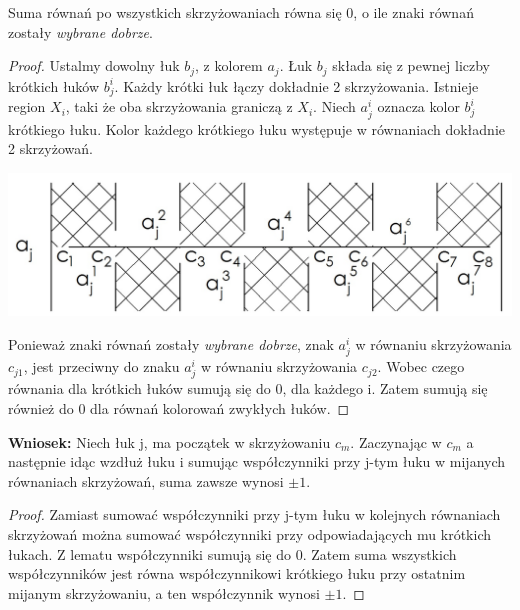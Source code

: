 \begin{lemat}
Suma równań po wszystkich skrzyżowaniach równa się 0, o ile znaki równań zostały \emph{wybrane dobrze}.
\end{lemat}
\begin{proof}
Ustalmy dowolny łuk $b_{j}$, z kolorem  $a_{j}$. Łuk $b_{j}$ składa się z pewnej liczby krótkich łuków $b_{j}^{i}$. Każdy krótki łuk łączy dokładnie 2 skrzyżowania. Istnieje region $X_{i}$, taki że oba skrzyżowania graniczą z $X_{i}$. Niech $a_{j}^{i}$ oznacza kolor $b_{j}^{i}$ krótkiego łuku. Kolor każdego krótkiego łuku występuje w równaniach dokładnie 2 skrzyżowań.
\begin{center}
  			\includegraphics[scale=0.3]{2/Obrazy/zerosum2}
\end{center}
Ponieważ znaki równań zostały  \emph{wybrane dobrze}, znak $a_{j}^{i}$ w równaniu skrzyżowania  
$c_{j1}$, jest przeciwny do znaku $a_{j}^{i}$ w równaniu skrzyżowania $c_{j2}$. Wobec czego równania dla krótkich łuków sumują się do 0, dla każdego i. Zatem sumują się również do 0 dla równań kolorowań zwykłych łuków.
\end{proof}

\textbf{Wniosek:} Niech łuk j, ma początek w skrzyżowaniu $c_{m}$. Zaczynając w $c_{m}$ a następnie idąc wzdłuż łuku i sumując współczynniki przy j-tym łuku w mijanych równaniach skrzyżowań, suma zawsze wynosi $\pm 1$.
\begin{proof}
Zamiast sumować współczynniki przy j-tym łuku w kolejnych równaniach skrzyżowań można sumować współczynniki przy odpowiadających mu krótkich łukach. Z lematu współczynniki sumują się do 0. Zatem suma wszystkich współczynników jest równa współczynnikowi krótkiego łuku przy ostatnim mijanym skrzyżowaniu, a ten współczynnik wynosi $\pm 1$.

\end{proof}

